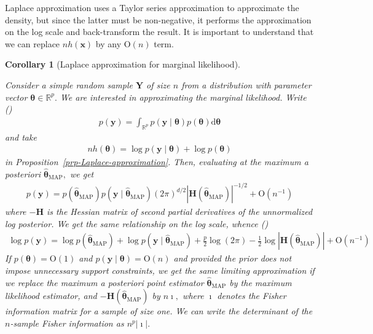 \documentclass[
  11pt,
  letterpaper,
]{scrbook}
\theoremstyle{definition}
\theoremstyle{plain}
\theoremstyle{plain}
\theoremstyle{plain}
\newtheorem{corollary}{Corollary}[chapter]
\theoremstyle{definition}
\theoremstyle{definition}
\theoremstyle{plain}
\theoremstyle{plain}
\newtheorem{corollary}{Corollary}[chapter]
\theoremstyle{remark}
\begin{document}
Laplace approximation uses a Taylor series approximation to approximate
the density, but since the latter must be non-negative, it performs the
approximation on the log scale and back-transform the result. It is
important to understand that we can replace \(nh(\boldsymbol{x})\) by
any \(\mathrm{O}(n)\) term.

\begin{corollary}[Laplace approximation for marginal
likelihood]\protect\hypertarget{cor-laplace-loglik}{}\label{cor-laplace-loglik}

Consider a simple random sample \(\boldsymbol{Y}\) of size \(n\) from a
distribution with parameter vector
\(\boldsymbol{\theta} \in \mathbb{R}^p.\) We are interested in
approximating the marginal likelihood. Write
() \begin{align*}
 p(\boldsymbol{y}) = \int_{\mathbb{R}^p} p(\boldsymbol{y} \mid \boldsymbol{\theta}) p(\boldsymbol{\theta}) \mathrm{d} \boldsymbol{\theta}
\end{align*} and take
\begin{align*}nh(\boldsymbol{\theta}) = \log p(\boldsymbol{y} \mid \boldsymbol{\theta}) + \log p(\boldsymbol{\theta})
\end{align*} in Proposition~\ref{prp-Laplace-approximation}. Then,
evaluating at the maximum a posteriori
\(\widehat{\boldsymbol{\theta}}_{\mathrm{MAP}},\) we get \begin{align*}
 p(\boldsymbol{y}) = p(\widehat{\boldsymbol{\theta}}_{\mathrm{MAP}})p(\boldsymbol{y} \mid \widehat{\boldsymbol{\theta}}_{\mathrm{MAP}}) (2\pi)^{d/2}|\mathbf{H}(\widehat{\boldsymbol{\theta}}_{\mathrm{MAP}})|^{-1/2} + \mathrm{O}(n^{-1})
\end{align*} where \(-\mathbf{H}\) is the Hessian matrix of second
partial derivatives of the unnormalized log posterior. We get the same
relationship on the log scale, whence
()
\begin{align*}
 \log p(\boldsymbol{y}) = \log p(\widehat{\boldsymbol{\theta}}_{\mathrm{MAP}}) + \log p(\boldsymbol{y} \mid \widehat{\boldsymbol{\theta}}_{\mathrm{MAP}}) + \frac{p}{2} \log (2\pi) - \frac{1}{2}\log |\mathbf{H}(\widehat{\boldsymbol{\theta}}_{\mathrm{MAP}})| + \mathrm{O}(n^{-1})
\end{align*} If \(p(\boldsymbol{\theta}) = \mathrm{O}(1)\) and
\(p(\boldsymbol{y} \mid \boldsymbol{\theta}) = \mathrm{O}(n)\) and
provided the prior does not impose unnecessary support constraints, we
get the same limiting approximation if we replace the maximum a
posteriori point estimator
\(\widehat{\boldsymbol{\theta}}_{\mathrm{MAP}}\) by the maximum
likelihood estimator, and
\(-\mathbf{H}(\widehat{\boldsymbol{\theta}}_{\mathrm{MAP}})\) by
\(n\boldsymbol{\imath},\) where \(\boldsymbol{\imath}\) denotes the
Fisher information matrix for a sample of size one. We can write the
determinant of the \(n\)-sample Fisher information as
\(n^{p}|\boldsymbol{\imath}|.\)


\end{corollary}
\end{document}
